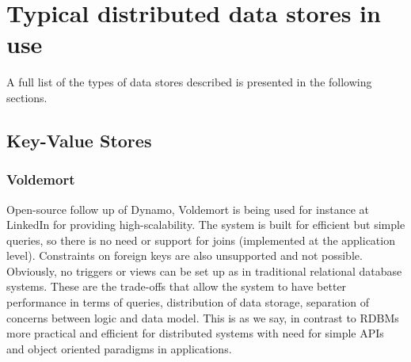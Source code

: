 		
	
		



\section{Typical distributed data stores in use} %
A full list of the types of data stores described is presented in the following sections.

\subsection{Key-Value Stores}

	\subsubsection{Voldemort}	
	Open-source follow up of Dynamo, Voldemort is being used for instance at LinkedIn for providing high-scalability. The system is built for efficient but simple queries, so there is no need or support for joins (implemented at the application level). Constraints on foreign keys are also unsupported and not possible. Obviously, no triggers or views can be set up as in traditional relational database systems. These are the trade-offs that allow the system to have better performance in terms of queries, distribution of data storage, separation of concerns between logic and data model. This is as we say, in contrast to RDBMs more practical and efficient for distributed systems with need for simple APIs and object oriented paradigms in applications.
	
